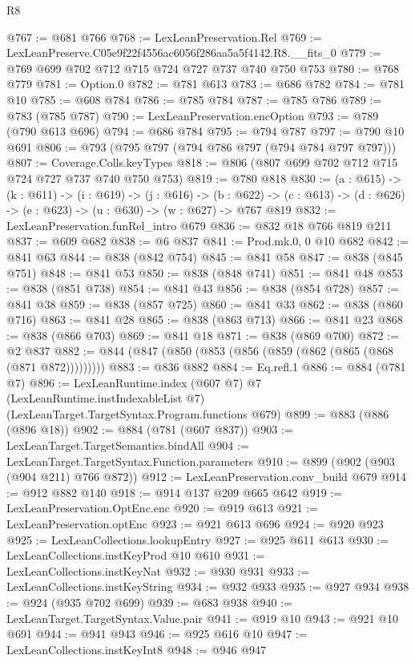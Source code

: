 \begin{lexlean}{R8}
\begin{coremodule}
@767 := @681 @766
@768 := LexLeanPreservation.Rel
@769 := LexLeanPreserve.C05e9f22f4556ac6056f286aa5a5f4142.R8.__fits_0
@779 := @769 @699 @702 @712 @715 @724 @727 @737 @740 @750 @753
@780 := @768 @779
@781 := Option.{0}
@782 := @781 @613
@783 := @686 @782
@784 := @781 @10
@785 := @608 @784
@786 := @785 @784
@787 := @785 @786
@789 := @783 (@785 @787)
@790 := LexLeanPreservation.encOption
@793 := @789 (@790 @613 @696)
@794 := @686 @784
@795 := @794 @787
@797 := @790 @10 @691
@806 := @793 (@795 @797 (@794 @786 @797 (@794 @784 @797 @797)))
@807 := Coverage.Colls.keyTypes
@818 := @806 (@807 @699 @702 @712 @715 @724 @727 @737 @740 @750 @753)
@819 := @780 @818
@830 := (a : @615) ->
  (k : @611) ->
  (i : @619) ->
  (j : @616) ->
  (b : @622) -> (c : @613) -> (d : @626) -> (e : @623) -> (u : @630) -> (w : @627) -> @767 @819
@832 := LexLeanPreservation.funRel_intro @679
@836 := @832 @18 @766 @819 @211
@837 := @609 @682
@838 := @6 @837
@841 := Prod.mk.{0, 0} @10 @682
@842 := @841 @63
@844 := @838 (@842 @754)
@845 := @841 @58
@847 := @838 (@845 @751)
@848 := @841 @53
@850 := @838 (@848 @741)
@851 := @841 @48
@853 := @838 (@851 @738)
@854 := @841 @43
@856 := @838 (@854 @728)
@857 := @841 @38
@859 := @838 (@857 @725)
@860 := @841 @33
@862 := @838 (@860 @716)
@863 := @841 @28
@865 := @838 (@863 @713)
@866 := @841 @23
@868 := @838 (@866 @703)
@869 := @841 @18
@871 := @838 (@869 @700)
@872 := @2 @837
@882 := @844 (@847 (@850 (@853 (@856 (@859 (@862 (@865 (@868 (@871 @872)))))))))
@883 := @836 @882
@884 := Eq.refl.{1}
@886 := @884 (@781 @7)
@896 := LexLeanRuntime.index
    (@607 @7)
    @7
    (LexLeanRuntime.instIndexableList @7)
    (LexLeanTarget.TargetSyntax.Program.functions @679)
@899 := @883 (@886 (@896 @18))
@902 := @884 (@781 (@607 @837))
@903 := LexLeanTarget.TargetSemantics.bindAll
@904 := LexLeanTarget.TargetSyntax.Function.parameters
@910 := @899 (@902 (@903 (@904 @211) @766 @872))
@912 := LexLeanPreservation.conv_build @679
@914 := @912 @882 @140
@918 := @914 @137 @209 @665 @642
@919 := LexLeanPreservation.OptEnc.enc
@920 := @919 @613
@921 := LexLeanPreservation.optEnc
@923 := @921 @613 @696
@924 := @920 @923
@925 := LexLeanCollections.lookupEntry
@927 := @925 @611 @613
@930 := LexLeanCollections.instKeyProd @10 @610
@931 := LexLeanCollections.instKeyNat
@932 := @930 @931
@933 := LexLeanCollections.instKeyString
@934 := @932 @933
@935 := @927 @934
@938 := @924 (@935 @702 @699)
@939 := @683 @938
@940 := LexLeanTarget.TargetSyntax.Value.pair
@941 := @919 @10
@943 := @921 @10 @691
@944 := @941 @943
@946 := @925 @616 @10
@947 := LexLeanCollections.instKeyInt8
@948 := @946 @947

\end{coremodule}
\end{lexlean}
